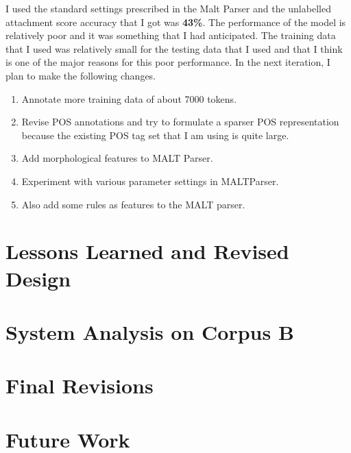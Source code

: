 \documentclass[11pt,letterpaper]{article}
\begin{document}
I used the standard settings prescribed in the Malt Parser and the unlabelled attachment score accuracy that I got was \textbf{43\%}. The performance of the 
model is relatively poor and it was something that I had anticipated. The training data that I used was relatively small for the testing data that 
I used and that I think is one of the major reasons for this poor performance. In the next iteration, I plan to make the following changes.

\begin{enumerate}
 \item Annotate more training data of about 7000 tokens.
 \item Revise POS annotations and try to formulate a sparser POS representation because the existing POS tag set that I am using is quite large.
 \item Add morphological features to MALT Parser.
 \item Experiment with various parameter settings in MALTParser.
 \item Also add some rules as features to the MALT parser.
\end{enumerate}

\section{Lessons Learned and Revised Design}

\section{System Analysis on Corpus B}

\section{Final Revisions}

\section{Future Work}




\label{lastpage}
\end{document}
